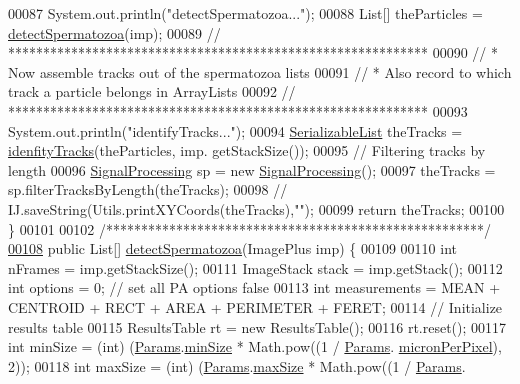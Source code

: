 \begin{DoxyCode}
00087     System.out.println(\textcolor{stringliteral}{"detectSpermatozoa..."});
00088     List[] theParticles =  \hyperlink{classfunctions_1_1_video_recognition_a08fc1c8ff56553233cab77b1dea7b978}{detectSpermatozoa}(imp);
00089     \textcolor{comment}{// ************************************************************}
00090     \textcolor{comment}{// * Now assemble tracks out of the spermatozoa lists}
00091     \textcolor{comment}{// * Also record to which track a particle belongs in ArrayLists}
00092     \textcolor{comment}{// ************************************************************}
00093     System.out.println(\textcolor{stringliteral}{"identifyTracks..."});
00094     \hyperlink{classdata_1_1_serializable_list}{SerializableList} theTracks = \hyperlink{classfunctions_1_1_video_recognition_a31e3f4ea058db30f6dc0bd3d192d6b4b}{idenfityTracks}(theParticles, imp.
      getStackSize());
00095     \textcolor{comment}{// Filtering tracks by length}
00096     \hyperlink{classfunctions_1_1_signal_processing}{SignalProcessing} sp = \textcolor{keyword}{new} \hyperlink{classfunctions_1_1_signal_processing}{SignalProcessing}();
00097     theTracks = sp.filterTracksByLength(theTracks);
00098     \textcolor{comment}{// IJ.saveString(Utils.printXYCoords(theTracks),"");}
00099     \textcolor{keywordflow}{return} theTracks;
00100   \}  
00101   
00102   \textcolor{comment}{/******************************************************/}
\hypertarget{_video_recognition_8java_source_l00108}{}\hyperlink{classfunctions_1_1_video_recognition_a08fc1c8ff56553233cab77b1dea7b978}{00108}   \textcolor{keyword}{public} List[] \hyperlink{classfunctions_1_1_video_recognition_a08fc1c8ff56553233cab77b1dea7b978}{detectSpermatozoa}(ImagePlus imp) \{
00109 
00110     \textcolor{keywordtype}{int} nFrames = imp.getStackSize();
00111     ImageStack stack = imp.getStack();
00112     \textcolor{keywordtype}{int} options = 0; \textcolor{comment}{// set all PA options false}
00113     \textcolor{keywordtype}{int} measurements = MEAN + CENTROID + RECT + AREA + PERIMETER + FERET;
00114     \textcolor{comment}{// Initialize results table}
00115     ResultsTable rt = \textcolor{keyword}{new} ResultsTable();
00116     rt.reset();
00117     \textcolor{keywordtype}{int} minSize = (int) (\hyperlink{classdata_1_1_params}{Params}.\hyperlink{classdata_1_1_params_a0aac8d82501e8bd6df290478d853662b}{minSize} * Math.pow((1 / \hyperlink{classdata_1_1_params}{Params}.
      \hyperlink{classdata_1_1_params_a19331ee97ef3c422984fc7dff976549e}{micronPerPixel}), 2));
00118     \textcolor{keywordtype}{int} maxSize = (int) (\hyperlink{classdata_1_1_params}{Params}.\hyperlink{classdata_1_1_params_a7274c4f365a3b3d5e70f4c0e797684ac}{maxSize} * Math.pow((1 / \hyperlink{classdata_1_1_params}{Params}.

\end{DoxyCode}
